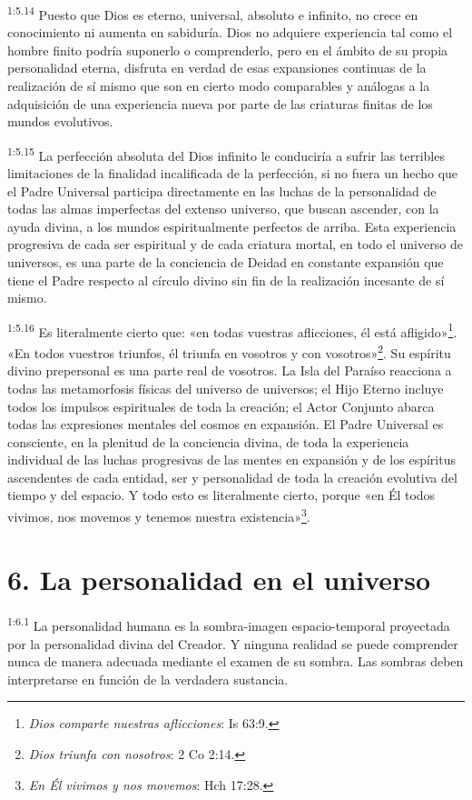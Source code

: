 \par
\textsuperscript{1:5.14} Puesto que Dios es eterno, universal, absoluto e infinito, no crece en conocimiento ni aumenta en sabiduría. Dios no adquiere experiencia tal como el hombre finito podría suponerlo o comprenderlo, pero en el ámbito de su propia personalidad eterna, disfruta en verdad de esas expansiones continuas de la realización de sí mismo que son en cierto modo comparables y análogas a la adquisición de una experiencia nueva por parte de las criaturas finitas de los mundos evolutivos.

\par
\textsuperscript{1:5.15} La perfección absoluta del Dios infinito le conduciría a sufrir las terribles limitaciones de la finalidad incalificada de la perfección, si no fuera un hecho que el Padre Universal participa directamente en las luchas de la personalidad de todas las almas imperfectas del extenso universo, que buscan ascender, con la ayuda divina, a los mundos espiritualmente perfectos de arriba. Esta experiencia progresiva de cada ser espiritual y de cada criatura mortal, en todo el universo de universos, es una parte de la conciencia de Deidad en constante expansión que tiene el Padre respecto al círculo divino sin fin de la realización incesante de sí mismo.

\par
\textsuperscript{1:5.16} Es literalmente cierto que: «en todas vuestras aflicciones, él está afligido»\footnote{\textit{Dios comparte nuestras aflicciones}: Is 63:9.}. «En todos vuestros triunfos, él triunfa en vosotros y con vosotros»\footnote{\textit{Dios triunfa con nosotros}: 2 Co 2:14.}. Su espíritu divino prepersonal es una parte real de vosotros. La Isla del Paraíso reacciona a todas las metamorfosis físicas del universo de universos; el Hijo Eterno incluye todos los impulsos espirituales de toda la creación; el Actor Conjunto abarca todas las expresiones mentales del cosmos en expansión. El Padre Universal es consciente, en la plenitud de la conciencia divina, de toda la experiencia individual de las luchas progresivas de las mentes en expansión y de los espíritus ascendentes de cada entidad, ser y personalidad de toda la creación evolutiva del tiempo y del espacio. Y todo esto es literalmente cierto, porque «en Él todos vivimos, nos movemos y tenemos nuestra existencia»\footnote{\textit{En Él vivimos y nos movemos}: Hch 17:28.}.

\section*{6. La personalidad en el universo}
\par
\textsuperscript{1:6.1} La personalidad humana es la sombra-imagen espacio-temporal proyectada por la personalidad divina del Creador. Y ninguna realidad se puede comprender nunca de manera adecuada mediante el examen de su sombra. Las sombras deben interpretarse en función de la verdadera sustancia.

